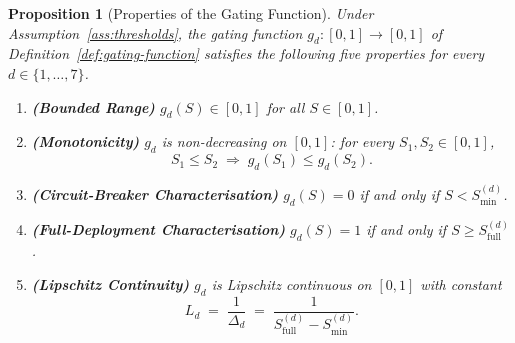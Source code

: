 \documentclass[12pt,openany]{book}
\numberwithin{equation}{chapter}
\theoremstyle{plain}
\newtheorem{proposition}[theorem]{Proposition}
\theoremstyle{definition}
\theoremstyle{remark}
\def\mathcal#1{#1}%
\begin{document}
\begin{proposition}[Properties of the Gating Function]
\label{prop:gating-properties}
Under Assumption~\ref{ass:thresholds}, the gating function
$g_d : [0,1] \to [0,1]$ of Definition~\ref{def:gating-function}
satisfies the following five properties for every
$d \in \{1,\ldots,7\}$.
\begin{enumerate}
  \item \textbf{(Bounded Range)}
        $g_d(\mathcal{S}) \in [0,1]$
        for all $\mathcal{S} \in [0,1]$.
  \item \textbf{(Monotonicity)}
        $g_d$ is non-decreasing on $[0,1]$: for every
        $\mathcal{S}_1, \mathcal{S}_2 \in [0,1]$,
        \[
          \mathcal{S}_1 \leq \mathcal{S}_2
          \;\Longrightarrow\;
          g_d(\mathcal{S}_1) \leq g_d(\mathcal{S}_2).
        \]
  \item \textbf{(Circuit-Breaker Characterisation)}
        $g_d(\mathcal{S}) = 0$
        if and only if $\mathcal{S} < \mathcal{S}_{\min}^{(d)}$.
  \item \textbf{(Full-Deployment Characterisation)}
        $g_d(\mathcal{S}) = 1$
        if and only if
        $\mathcal{S} \geq \mathcal{S}_{\mathrm{full}}^{(d)}$.
  \item \textbf{(Lipschitz Continuity)}
        $g_d$ is Lipschitz continuous on $[0,1]$ with constant
        \[
          L_d \;=\; \frac{1}{\Delta_d}
               \;=\;
               \frac{1}{\mathcal{S}_{\mathrm{full}}^{(d)}
                        - \mathcal{S}_{\min}^{(d)}}.
        \]
\end{enumerate}
\end{proposition}
\end{document}
